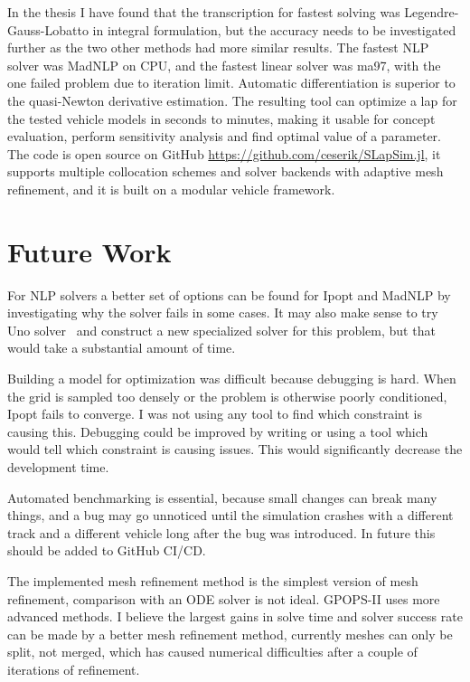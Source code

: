 In the thesis I have found that the transcription for fastest solving was Legendre-Gauss-Lobatto in integral formulation, but the accuracy needs to be investigated further as the two other methods had more similar results. The fastest NLP solver was MadNLP on CPU, and the fastest linear solver was ma97, with the one failed problem due to iteration limit. Automatic differentiation is superior to the quasi-Newton derivative estimation. The resulting tool can optimize a lap for the tested vehicle models in seconds to minutes, making it usable for concept evaluation, perform sensitivity analysis and find optimal value of a parameter. The code is open source on GitHub \url{https://github.com/ceserik/SLapSim.jl}, it supports multiple collocation schemes and solver backends with adaptive mesh refinement, and it is built on a modular vehicle framework.

\section{Future Work}
For NLP solvers a better set of options can be found for Ipopt and MadNLP by investigating why the solver fails in some cases. It may also make sense to try Uno solver~\cite{vanaret_implementing_2025} and construct a new specialized solver for this problem, but that would take a substantial amount of time.

Building a model for optimization was difficult because debugging is hard. When the grid is sampled too densely or the problem is otherwise poorly conditioned, Ipopt fails to converge. I was not using any tool to find which constraint is causing this. Debugging could be improved by writing or using a tool which would tell which constraint is causing issues. This would significantly decrease the development time.

Automated benchmarking is essential, because small changes can break many things, and a bug may go unnoticed until the simulation crashes with a different track and a different vehicle long after the bug was introduced. In future this should be added to GitHub CI/CD.

The implemented mesh refinement method is the simplest version of mesh refinement, comparison with an ODE solver is not ideal. GPOPS-II uses more advanced methods. I believe the largest gains in solve time and solver success rate can be made by a better mesh refinement method, currently meshes can only be split, not merged, which has caused numerical difficulties after a couple of iterations of refinement.

